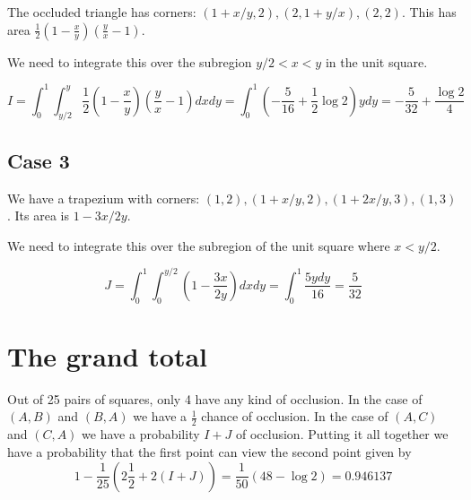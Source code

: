 \documentclass[12pt]{article}
\begin{document}
The occluded triangle has corners: $(1+x/y,2), (2,1+y/x), (2,2)$.
This has area $\frac{1}{2}\left(1-\frac{x}{y}\right)\left(\frac{y}{x}-1\right)$.

We need to integrate this over the subregion $y/2<x<y$ in the unit square.

\[
I =
\int_0^1 \int_{y/2}^y \frac{1}{2}\left(1-\frac{x}{y}\right)\left(\frac{y}{x}-1\right)  dxdy
= \int_0^1 \left(-\frac{5}{16}+\frac{1}{2}\log 2\right)y  dy
= -\frac{5}{32}+\frac{\log 2}{4}
\]

\subsection{Case 3}
\begin{center}
\end{center}

We have a trapezium with corners: $(1,2), (1+x/y,2), (1+2x/y,3), (1,3)$.
Its area is $1-3x/2y$.

We need to integrate this over the subregion of the unit square where $x < y/2$.

\[
J =
\int_0^1 \int_0^{y/2} \left(1-\frac{3x}{2y}\right) dxdy
= \int_0^1 \frac{5ydy}{16}
= \frac{5}{32}
\]

\section{The grand total}
Out of 25 pairs of squares, only 4 have any kind of occlusion.
In the case of $(A,B)$ and $(B,A)$ we have a $\frac{1}{2}$ chance of occlusion.
In the case of $(A,C)$ and $(C,A)$ we have a probability $I+J$ of occlusion.
Putting it all together we have a probability that the first point can view the second point given by
\[
1-\frac{1}{25}(2\frac{1}{2}+2(I+J)) = \frac{1}{50}(48-\log 2) = 0.946137
\]
\end{document}
